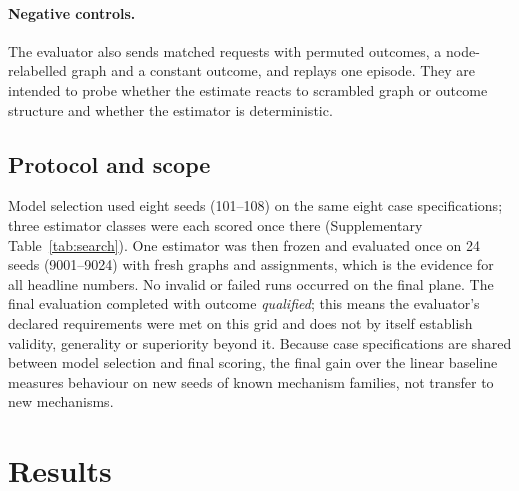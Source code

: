 \documentclass{article}
\begin{document}
\paragraph{Negative controls.} The evaluator also sends matched requests with permuted outcomes, a node-relabelled graph and a constant outcome, and replays one episode. They are intended to probe whether the estimate reacts to scrambled graph or outcome structure and whether the estimator is deterministic.

\subsection{Protocol and scope}
Model selection used eight seeds (101--108) on the same eight case specifications; three estimator classes were each scored once there (Supplementary Table~\ref{tab:search}). One estimator was then frozen and evaluated once on 24 seeds (9001--9024) with fresh graphs and assignments, which is the evidence for all headline numbers. No invalid or failed runs occurred on the final plane. The final evaluation completed with outcome \emph{qualified}; this means the evaluator's declared requirements were met on this grid and does not by itself establish validity, generality or superiority beyond it. Because case specifications are shared between model selection and final scoring, the final gain over the linear baseline measures behaviour on new seeds of known mechanism families, not transfer to new mechanisms.

\section{Results}
\end{document}
